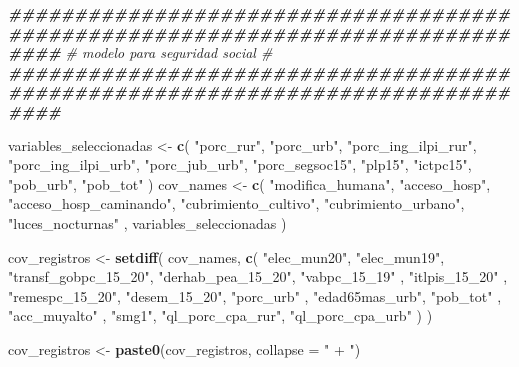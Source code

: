 \documentclass[
  12pt,
]{book}
\newenvironment{Shaded}{\begin{snugshade}}{\end{snugshade}}
\newcommand{\AttributeTok}[1]{\textcolor[rgb]{0.13,0.29,0.53}{#1}}
\newcommand{\CommentTok}[1]{\textcolor[rgb]{0.56,0.35,0.01}{\textit{#1}}}
\newcommand{\DocumentationTok}[1]{\textcolor[rgb]{0.56,0.35,0.01}{\textbf{\textit{#1}}}}
\newcommand{\FunctionTok}[1]{\textcolor[rgb]{0.13,0.29,0.53}{\textbf{#1}}}
\newcommand{\NormalTok}[1]{#1}
\newcommand{\OtherTok}[1]{\textcolor[rgb]{0.56,0.35,0.01}{#1}}
\newcommand{\StringTok}[1]{\textcolor[rgb]{0.31,0.60,0.02}{#1}}
\begin{document}
\begin{Shaded}
\begin{Highlighting}[]
\DocumentationTok{\#\#\#\#\#\#\#\#\#\#\#\#\#\#\#\#\#\#\#\#\#\#\#\#\#\#\#\#\#\#\#\#\#\#\#\#\#\#\#\#\#\#\#\#\#\#\#\#\#\#\#\#\#\#\#\#\#\#\#\#\#\#\#\#\#\#\#\#\#\#\#\#\#\#\#\#\#\#\#\#}
\CommentTok{\# modelo para seguridad social  \#}
\DocumentationTok{\#\#\#\#\#\#\#\#\#\#\#\#\#\#\#\#\#\#\#\#\#\#\#\#\#\#\#\#\#\#\#\#\#\#\#\#\#\#\#\#\#\#\#\#\#\#\#\#\#\#\#\#\#\#\#\#\#\#\#\#\#\#\#\#\#\#\#\#\#\#\#\#\#\#\#\#\#\#\#\#}

\NormalTok{variables\_seleccionadas }\OtherTok{\textless{}{-}}
  \FunctionTok{c}\NormalTok{(}
    \StringTok{"porc\_rur"}\NormalTok{,}
    \StringTok{"porc\_urb"}\NormalTok{,}
    \StringTok{"porc\_ing\_ilpi\_rur"}\NormalTok{,}
    \StringTok{"porc\_ing\_ilpi\_urb"}\NormalTok{,}
    \StringTok{"porc\_jub\_urb"}\NormalTok{,}
    \StringTok{"porc\_segsoc15"}\NormalTok{,}
    \StringTok{"plp15"}\NormalTok{,}
    \StringTok{"ictpc15"}\NormalTok{,}
    \StringTok{"pob\_urb"}\NormalTok{,}
    \StringTok{"pob\_tot"}
\NormalTok{  )}
\NormalTok{cov\_names }\OtherTok{\textless{}{-}} \FunctionTok{c}\NormalTok{(}
  \StringTok{"modifica\_humana"}\NormalTok{,}
  \StringTok{"acceso\_hosp"}\NormalTok{,}
  \StringTok{"acceso\_hosp\_caminando"}\NormalTok{,}
  \StringTok{"cubrimiento\_cultivo"}\NormalTok{,}
  \StringTok{"cubrimiento\_urbano"}\NormalTok{,}
  \StringTok{"luces\_nocturnas"}\NormalTok{ ,}
\NormalTok{  variables\_seleccionadas}
\NormalTok{)}

\NormalTok{cov\_registros }\OtherTok{\textless{}{-}}
  \FunctionTok{setdiff}\NormalTok{(}
\NormalTok{    cov\_names,}
    \FunctionTok{c}\NormalTok{(}
      \StringTok{"elec\_mun20"}\NormalTok{,}
      \StringTok{"elec\_mun19"}\NormalTok{,}
      \StringTok{"transf\_gobpc\_15\_20"}\NormalTok{,}
      \StringTok{"derhab\_pea\_15\_20"}\NormalTok{,}
      \StringTok{"vabpc\_15\_19"}\NormalTok{ ,}
      \StringTok{"itlpis\_15\_20"}\NormalTok{  ,}
      \StringTok{"remespc\_15\_20"}\NormalTok{,}
      \StringTok{"desem\_15\_20"}\NormalTok{,}
      \StringTok{"porc\_urb"}\NormalTok{ ,  }
      \StringTok{"edad65mas\_urb"}\NormalTok{, }
      \StringTok{"pob\_tot"}\NormalTok{ ,}
      \StringTok{"acc\_muyalto"}\NormalTok{ ,}
      \StringTok{"smg1"}\NormalTok{,}
      \StringTok{"ql\_porc\_cpa\_rur"}\NormalTok{,}
      \StringTok{"ql\_porc\_cpa\_urb"}
\NormalTok{    )}
\NormalTok{  )}


\NormalTok{cov\_registros }\OtherTok{\textless{}{-}} \FunctionTok{paste0}\NormalTok{(cov\_registros, }\AttributeTok{collapse =} \StringTok{" + "}\NormalTok{)}


\end{Highlighting}
\end{Shaded}
\end{document}
